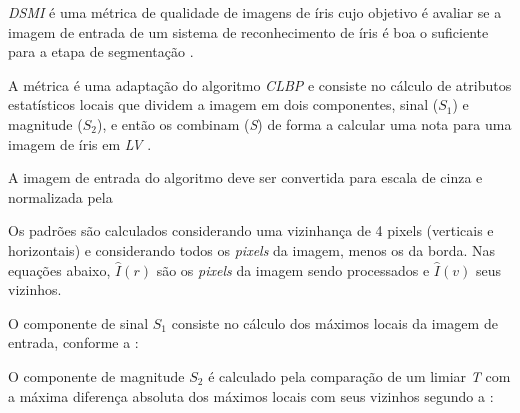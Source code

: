 \par \textit{\acrfull{DSMI}} é uma métrica de qualidade de imagens de íris cujo objetivo é avaliar se a imagem de entrada de um sistema de reconhecimento de íris é boa o suficiente para a etapa de segmentação \cite{Jenadeleh_2018_CVPR_Workshops}. 

\par A métrica é uma adaptação do algoritmo \textit{\acrfull{CLBP}} \cite{guo2010-CLBP} e consiste no cálculo de atributos estatísticos locais que dividem a imagem em dois componentes, sinal ($S_{1}$) e magnitude ($S_{2}$), e então os combinam (\textit{S}) de forma a calcular uma nota para uma imagem de íris em \textit{\acrfull{LV}} \cite{Jenadeleh_2018_CVPR_Workshops}.

\par A imagem de entrada do algoritmo deve ser convertida para escala de cinza e normalizada pela 


\par Os padrões são calculados considerando uma vizinhança de 4 pixels (verticais e horizontais) e considerando todos os \textit{pixels} da imagem, menos os da borda. Nas equações abaixo, $\widehat{I}(r)$ são os \textit{pixels} da imagem sendo processados e $\widehat{I}(v)$ seus vizinhos.

\par O componente de sinal $S_{1}$ consiste no cálculo dos máximos locais da imagem de entrada, conforme a  \cite{Jenadeleh_2018_CVPR_Workshops}:


\par O componente de magnitude $S_{2}$ é calculado pela comparação de um limiar \textit{T} com a máxima diferença absoluta dos máximos locais com seus vizinhos segundo a  \cite{Jenadeleh_2018_CVPR_Workshops}:


